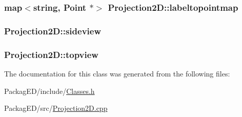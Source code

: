 \subsubsection[{\texorpdfstring{labeltopointmap}{labeltopointmap}}]{\setlength{\rightskip}{0pt plus 5cm}map$<$string, {\bf Point} $\ast$$>$ Projection2\+D\+::labeltopointmap}\hypertarget{class_projection2_d_a0afd92ccd321bc86e6e019b4bec99fc8}{}\label{class_projection2_d_a0afd92ccd321bc86e6e019b4bec99fc8}
\subsubsection[{\texorpdfstring{sideview}{sideview}}]{ Projection2\+D\+::sideview}\hypertarget{class_projection2_d_a82c9e3f197b07ffe9a10f59de60edbee}{}\label{class_projection2_d_a82c9e3f197b07ffe9a10f59de60edbee}
\subsubsection[{\texorpdfstring{topview}{topview}}]{ Projection2\+D\+::topview}\hypertarget{class_projection2_d_a90079954379a766f60ba01ad393327ab}{}\label{class_projection2_d_a90079954379a766f60ba01ad393327ab}


The documentation for this class was generated from the following files\+:\begin{DoxyCompactItemize}
\item 
Packag\+E\+D/include/\hyperlink{_classes_8h}{Classes.\+h}\item 
Packag\+E\+D/src/\hyperlink{_projection2_d_8cpp}{Projection2\+D.\+cpp}\end{DoxyCompactItemize}
